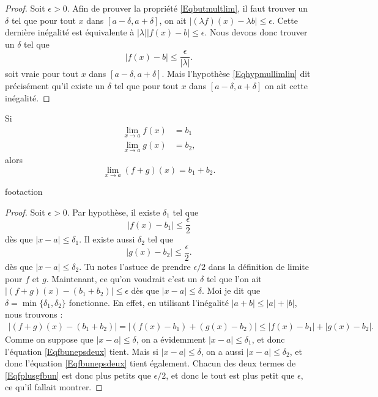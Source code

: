 \begin{proof}
Soit $\epsilon>0$. Afin de prouver la propriété \eqref{Eqbutmultlim}, il faut trouver un $\delta$ tel que pour tout $x$ dans $[a-\delta,a+\delta]$, on ait $| (\lambda f)(x)- \lambda b |\leq\epsilon$. Cette dernière inégalité est équivalente à $|\lambda|| f(x)-b |\leq\epsilon$. Nous devons donc trouver un $\delta$ tel que 
\begin{equation} 
| f(x)-b |\leq\frac{ \epsilon }{ | \lambda | }.
\end{equation}
soit vraie pour tout $x$ dans $[a-\delta,a+\delta]$. Mais l'hypothèse \eqref{Eqhypmullimlin} dit précisément qu'il existe un $\delta$ tel que pour tout $x$ dans $[a-\delta,a+\delta]$ on ait cette inégalité. 
\end{proof}

\begin{theorem}     \label{ThoLimLin}
    Si
    \begin{subequations}
    \begin{align}
        \lim_{x\to a}f(x)&=b_1\\
        \lim_{x\to a}g(x)&=b_2,
    \end{align}
    \end{subequations}
    alors
    \begin{equation}
        \lim_{x\to a}(f+g)(x)=b_1+b_2.
    \end{equation}
\end{theorem}


    footaction

\begin{proof}
    Soit $\epsilon>0$. Par hypothèse, il existe $\delta_1$ tel que
    \begin{equation}    \label{Eqfbunepsdeux}
      | f(x)-b_1 |\leq \frac{ \epsilon }{ 2 }
    \end{equation}
    dès que $| x-a |\leq\delta_1$. Il existe aussi $\delta_2$ tel que 
    \begin{equation}    \label{Eqgbdeuxepsdeux}
      | g(x)-b_2 |\leq \frac{ \epsilon }{ 2 }.
    \end{equation}
    dès que $| x-a |\leq \delta_2$. Tu notes l'astuce de prendre $\epsilon/2$ dans la définition de limite pour $f$ et $g$. Maintenant, ce qu'on voudrait c'est un $\delta$ tel que l'on ait $| (f+g)(x)-(b_1+b_2) |\leq \epsilon$ dès que $| x-a |\leq \delta$. Moi je dit que $\delta=\min\{ \delta_1,\delta_2 \}$ fonctionne. En effet, en utilisant l'inégalité $| a+b |\leq | a |+| b |$, nous trouvons :
    \begin{align}
    | (f+g)(x)-(b_1+b_2) |=| (f(x)-b_1)+(g(x)-b_2) |
            \leq | f(x)-b_1 |+| g(x)-b_2 |.     \label{Eqfplusgfbun}
    \end{align}
    Comme on suppose que $| x-a |\leq\delta$, on a évidemment $| x-a |\leq\delta_1$, et donc l'équation \eqref{Eqfbunepsdeux} tient. Mais si $| x-a |\leq\delta$, on a aussi $| x-a |\leq\delta_2$, et donc l'équation  \eqref{Eqfbunepsdeux} tient également. Chacun des deux termes de \eqref{Eqfplusgfbun} est donc plus petits que $\epsilon/2$, et donc le tout est plus petit que $\epsilon$, ce qu'il fallait montrer.

\end{proof}

